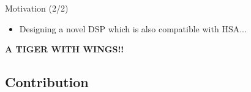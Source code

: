 \documentclass{beamer}
\begin{document}
\begin{CJK}{UTF8}{bkai}
\begin{frame}{Motivation (2/2)}
                \begin{itemize}
                    \pause
                    \item {
                            Designing a novel DSP which is also compatible with HSA...
                        }
                \end{itemize}
                \pause
                \begin{center}
                {\large{\textbf{A TIGER WITH WINGS!!}}}
                \end{center}
    \end{frame}


    \subsection{Contribution}


\end{CJK}
\end{document}
